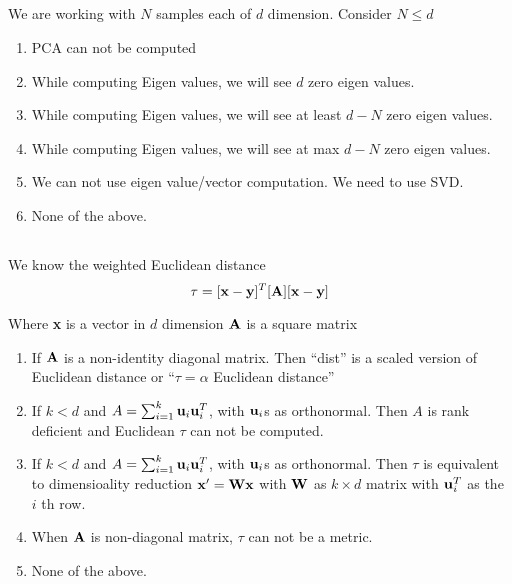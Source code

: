 \begin{frame}
\section{}
We are working with $N$ samples each of $d$ dimension.
Consider $N\le d$

\begin{enumerate}
\item PCA can not be computed
\item While computing Eigen values, we will see $d$ zero eigen values.
\item While computing Eigen values, we will see at least $d-N$ zero eigen values.   %
\item While computing Eigen values, we will see at max $d-N$ zero eigen values.   %
\item We can not use eigen value/vector computation. We need to use SVD.    %
\item None of the above.    %
\end{enumerate}
\end{frame}

\begin{frame}
\section{}
We know the weighted Euclidean distance
\[ \tau = [{\bf x} - {\bf y}]^T[{\bf A}][{\bf x} - {\bf y}] \]

Where {\bf x} is a vector in $d$ dimension ${\bf A}$ is a square matrix

\begin{enumerate}
\item If ${\bf A}$ is a non-identity diagonal matrix. Then ``dist'' is a scaled version of Euclidean distance or ``$\tau  = \alpha$  Euclidean distance''   %
\item If $k < d$ and $A = \sum_{i=1}^k {\bf u}_i{\bf u}_i^T$, with ${\bf u}_i$s as orthonormal. Then $A$ is rank deficient and Euclidean $\tau$ can not be computed.
\item If $k < d$ and $A = \sum_{i=1}^k {\bf u}_i{\bf u}_i^T$, with ${\bf u}_i$s as orthonormal. Then $\tau$ is equivalent to dimensioality reduction ${\bf x}^\prime = {\bf W}{\bf x}$ with ${\bf W}$ as $k\times d$ matrix with ${\bf u}_i^T$ as the $i$ th row.   %
\item When ${\bf A}$ is non-diagonal matrix, $\tau$ can not be a metric.
\item None of the above.    %
\end{enumerate}
\end{frame}

